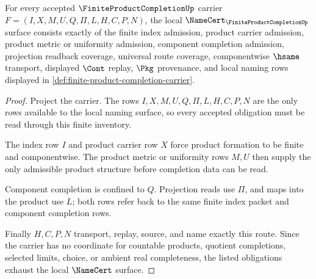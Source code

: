 \begin{theorem}
\label{thm:finite-product-completion-namecert-obligations}
For every accepted $\FiniteProductCompletionUp$ carrier $F=(I,X,M,U,Q,\Pi,L,H,C,P,N)$, the local $\NameCert_{\FiniteProductCompletionUp}$ surface consists exactly of the finite index admission, product carrier admission, product metric or uniformity admission, component completion admission, projection readback coverage, universal route coverage, componentwise $\hsame$ transport, displayed $\Cont$ replay, $\Pkg$ provenance, and local naming rows displayed in \autoref{def:finite-product-completion-carrier}.
\end{theorem}
\begin{proof}
Project the carrier. The rows $I,X,M,U,Q,\Pi,L,H,C,P,N$ are the only rows available to the local naming surface, so every accepted obligation must be read through this finite inventory.

The index row $I$ and product carrier row $X$ force product formation to be finite and componentwise. The product metric or uniformity rows $M,U$ then supply the only admissible product structure before completion data can be read.

Component completion is confined to $Q$. Projection reads use $\Pi$, and maps into the product use $L$; both rows refer back to the same finite index packet and component completion rows.

Finally $H,C,P,N$ transport, replay, source, and name exactly this route. Since the carrier has no coordinate for countable products, quotient completions, selected limits, choice, or ambient real completeness, the listed obligations exhaust the local $\NameCert$ surface.
\end{proof}

